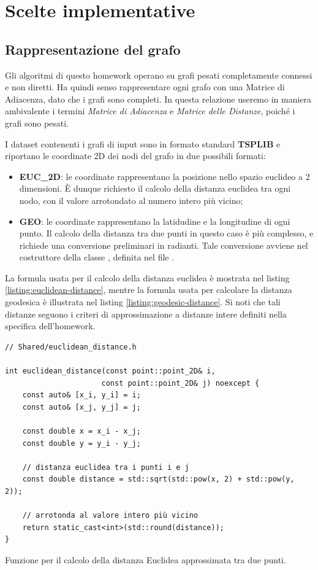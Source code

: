 \section{Scelte implementative}
\label{cap:implementation-choices}

\subsection{Rappresentazione del grafo}
\label{sub:graph-representation}

Gli algoritmi di questo homework operano su grafi pesati completamente connessi e non diretti. Ha quindi senso rappresentare ogni grafo con una Matrice di Adiacenza, dato che i grafi sono completi. In questa relazione useremo in maniera ambivalente i termini \textit{Matrice di Adiacenza} e \textit{Matrice delle Distanze}, poiché i grafi sono pesati.

\noindent I dataset contenenti i grafi di input sono in formato standard \textbf{TSPLIB } e riportano le coordinate 2D dei nodi del grafo in due possibili formati:

\begin{itemize}
    \item \textbf{EUC\_2D}: le coordinate rappresentano la posizione nello spazio euclideo a 2 dimensioni. È dunque richiesto il calcolo della distanza euclidea tra ogni nodo, con il valore arrotondato al numero intero più vicino;
    \item \textbf{GEO}: le coordinate rappresentano la latidudine e la longitudine di ogni punto. Il calcolo della distanza tra due punti in questo caso è più complesso, e richiede una conversione preliminari in radianti. Tale conversione avviene nel costruttore della classe , definita nel file .
\end{itemize}

\noindent La formula usata per il calcolo della distanza euclidea è mostrata nel listing \ref{listing:euclidean-distance}, mentre la formula usata per calcolare la distanza geodesica è illustrata nel listing \ref{listing:geodesic-distance}. Si noti che tali distanze seguono i criteri di approssimazione a distanze intere definiti nella specifica dell'homework.

\begin{listing}[!ht]
\begin{verbatim}
// Shared/euclidean_distance.h

int euclidean_distance(const point::point_2D& i,
                      const point::point_2D& j) noexcept {
    const auto& [x_i, y_i] = i;
    const auto& [x_j, y_j] = j;

    const double x = x_i - x_j;
    const double y = y_i - y_j;

    // distanza euclidea tra i punti i e j
    const double distance = std::sqrt(std::pow(x, 2) + std::pow(y, 2));

    // arrotonda al valore intero più vicino
    return static_cast<int>(std::round(distance));
}
\end{verbatim}
\caption{Funzione per il calcolo della distanza Euclidea approssimata tra due punti.}
\label{listing:euclidean-distance}
\end{listing}

